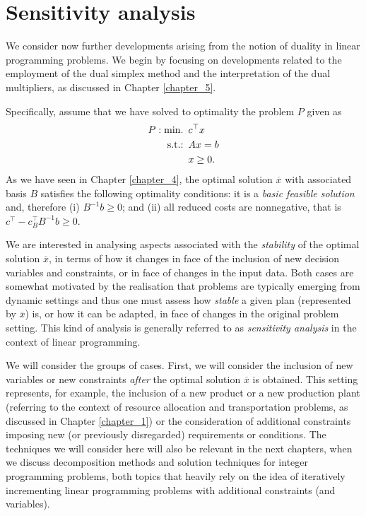 \section{Sensitivity analysis}

We consider now further developments arising from the notion of duality in linear programming problems. We begin by focusing on developments related to the employment of the dual simplex method and the interpretation of the dual multipliers, as discussed in Chapter \ref{chapter_5}. 

Specifically, assume that we have solved to optimality the problem $P$ given as
%
\begin{align*}
	P : \mathop{\text{min.~}} \, &c^\top x \\
	\mathop{\text{s.t.:~}} \, & Ax = b \\
	& x \geq 0. 	
\end{align*}
%
As we have seen in Chapter \ref{chapter_4}, the optimal solution $\overline{x}$ with associated basis $B$ satisfies the following optimality conditions: it is a \emph{basic feasible solution} and, therefore (i) $B^{-1}b \geq 0$; and (ii) all reduced costs are nonnegative, that is $c^\top - c_B^\top B^{-1}b \geq 0$.

We are interested in analysing aspects associated with the \emph{stability} of the optimal solution $\overline{x}$, in terms of how it changes in face of the inclusion of new decision variables and constraints, or in face of changes in the input data. Both cases are somewhat motivated by the realisation that problems are typically emerging from dynamic settings and thus one must assess how \emph{stable} a given plan (represented by $\overline{x}$) is, or how it can be adapted, in face of changes in the original problem setting. This kind of analysis is generally referred to as \emph{sensitivity analysis} in the context of linear programming.

We will consider the groups of cases. First, we will consider the inclusion of new variables or new constraints \emph{after} the optimal solution $\overline{x}$ is obtained. This setting represents, for example, the inclusion of a new product or a new production plant (referring to the context of resource allocation and transportation problems, as discussed in Chapter \ref{chapter_1}) or the consideration of additional constraints imposing new (or previously disregarded) requirements or conditions. The techniques we will consider here will also be relevant in the next chapters, when we discuss decomposition methods and solution techniques for integer programming problems, both topics that heavily rely on the idea of iteratively incrementing linear programming problems with additional constraints (and variables).

